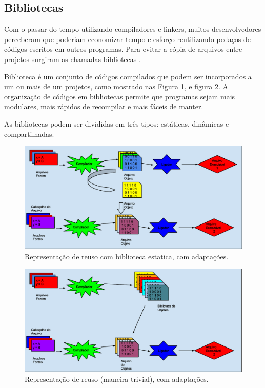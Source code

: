 \subsection{Bibliotecas}

Com o passar do tempo utilizando compiladores e linkers, muitos 
desenvolvedores perceberam que poderiam economizar tempo e esforço 
reutilizando pedaços de códigos escritos em outros programas. Para evitar a
 cópia de arquivos entre projetos surgiram as chamadas bibliotecas \cite{ref38}.

Biblioteca é um conjunto de códigos compilados que podem ser incorporados a
 um ou mais de um projetos, como mostrado nas Figura \ref{fig04}, e figura
 \ref{fig05}. A organização de códigos em bibliotecas permite que 
programas sejam mais modulares, mais rápidos de recompilar e mais 
fáceis de manter\cite{Lasca}.

As bibliotecas podem ser divididas em três tipos:  estáticas, 
dinâmicas e compartilhadas\cite{Lasca}.

\begin{figure}[h]
    \centering
    \label{fig04}
        \includegraphics[keepaspectratio=true,scale=0.3]{figuras/reuso_lib_estatica.eps}
    \caption{ Representação de reuso com biblioteca estatica, com adaptações\cite{ref39}.}
\end{figure}

\begin{figure}[h]
    \centering
    \label{fig05}
        \includegraphics[keepaspectratio=true,scale=0.3]{figuras/reuso_lib_estatica2.eps}
    \caption{ Representação de reuso (maneira trivial), com adaptações\cite{ref40}.}
\end{figure}



